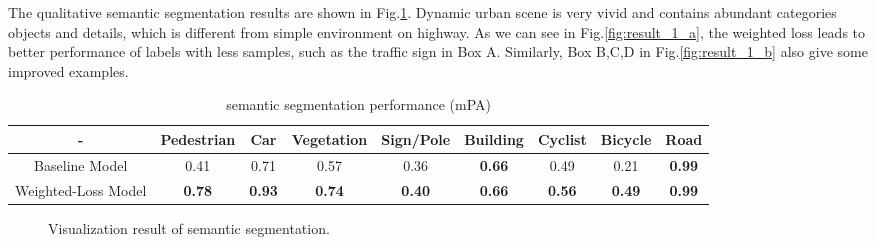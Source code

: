 The qualitative semantic segmentation results are shown in Fig.\ref{fig:result_1}. Dynamic urban scene is very vivid and contains abundant categories objects and details, which is different from simple environment on highway. As we can see in Fig.\ref{fig:result_1_a}, the weighted loss leads to better performance of labels with less samples, such as the traffic sign in Box A. Similarly, Box B,C,D in Fig.\ref{fig:result_1_b} also give some improved examples.

\begin{table}
	\caption{semantic segmentation performance (mPA)}
	\label{performance}
	\centering
	\small
	\renewcommand{\arraystretch}{1.5}
	\begin{tabular}{|c|c|c|c|c|c|c|c|c|}
		\hline
		- & Pedestrian & Car & Vegetation & Sign/Pole & Building & Cyclist & Bicycle & Road	\\
		\hline
		Baseline Model & 0.41 & 0.71 & 0.57 & 0.36 & \textbf{0.66} & 0.49 & 0.21 & \textbf{0.99}	\\
		\hline
		Weighted-Loss Model& \textbf{0.78} & \textbf{0.93} & \textbf{0.74} & \textbf{0.40} & \textbf{0.66} & \textbf{0.56} & \textbf{0.49} & \textbf{0.99}	\\
		\hline
	\end{tabular}
\end{table}

\begin{figure}
	\centering
	\caption{Visualization result of semantic segmentation.}
	\label{fig:result_1}
\end{figure}	

